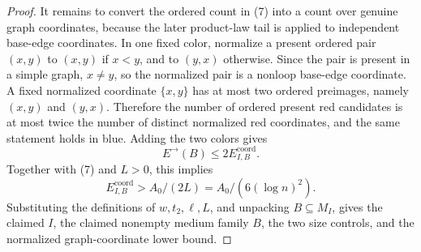 \begin{proof}
It remains to convert the ordered count in (7) into a count over genuine graph
coordinates, because the later product-law tail is applied to independent
base-edge coordinates.  In one fixed color, normalize a present ordered pair
\((x,y)\) to \((x,y)\) if \(x<y\), and to \((y,x)\) otherwise.  Since the pair
is present in a simple graph, \(x\ne y\), so the normalized pair is a nonloop
base-edge coordinate.  A fixed normalized coordinate \(\{x,y\}\) has at most
two ordered preimages, namely \((x,y)\) and \((y,x)\).  Therefore the number
of ordered present red candidates is at most twice the number of distinct
normalized red coordinates, and the same statement holds in blue.  Adding the
two colors gives
\[
E^\rightarrow(B)\le 2E^{\mathrm{coord}}_{I,B}.
\]
Together with (7) and \(L>0\), this implies
\[
E^{\mathrm{coord}}_{I,B}>A_0/(2L)=A_0/(6(\log n)^2).
\]
Substituting the definitions of \(w,t_2,\ell,L\), and unpacking
\(B\subseteq M_I\), gives the claimed \(I\), the claimed nonempty medium
family \(B\), the two size controls, and the normalized graph-coordinate lower
bound.
\end{proof}
